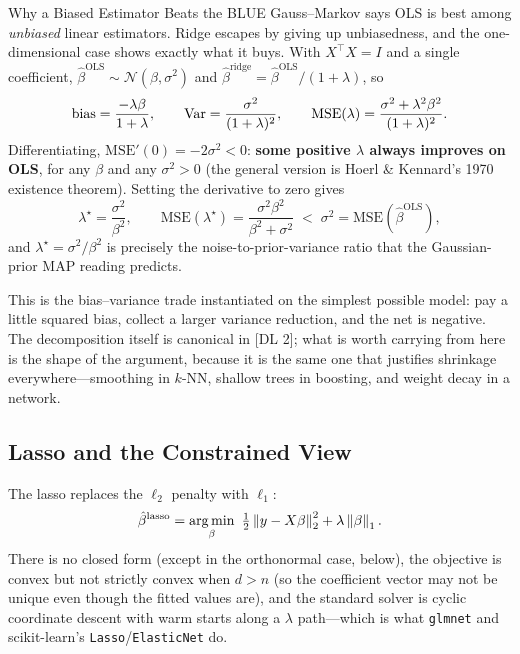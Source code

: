 \begin{mathresult}{Why a Biased Estimator Beats the BLUE}
Gauss--Markov says OLS is best among \emph{unbiased} linear estimators. Ridge escapes by giving up unbiasedness, and the one-dimensional case shows exactly what it buys. With $X^{\top}X = I$ and a single coefficient, $\hat\beta^{\text{OLS}} \sim \mathcal{N}(\beta, \sigma^2)$ and $\hat\beta^{\text{ridge}} = \hat\beta^{\text{OLS}}/(1+\lambda)$, so
\begin{equation}
\text{bias} = \frac{-\lambda\beta}{1+\lambda}, \qquad \operatorname{Var} = \frac{\sigma^2}{(1+\lambda)^2},
\qquad
\text{MSE}(\lambda) = \frac{\sigma^2 + \lambda^2\beta^2}{(1+\lambda)^2} .
\end{equation}
Differentiating, $\text{MSE}'(0) = -2\sigma^2 < 0$: \textbf{some positive $\lambda$ always improves on OLS}, for any $\beta$ and any $\sigma^2 > 0$ (the general version is Hoerl \& Kennard's 1970 existence theorem). Setting the derivative to zero gives
\begin{equation}
\lambda^\star = \frac{\sigma^2}{\beta^2},
\qquad
\text{MSE}(\lambda^\star) = \frac{\sigma^2\beta^2}{\beta^2 + \sigma^2} \;<\; \sigma^2 = \text{MSE}(\hat\beta^{\text{OLS}}),
\end{equation}
and $\lambda^\star = \sigma^2/\beta^2$ is precisely the noise-to-prior-variance ratio that the Gaussian-prior MAP reading predicts.
\end{mathresult}

This is the bias--variance trade instantiated on the simplest possible model: pay a little squared bias, collect a larger variance reduction, and the net is negative. The decomposition itself is canonical in [DL 2]; what is worth carrying from here is the shape of the argument, because it is the same one that justifies shrinkage everywhere---smoothing in $k$-NN, shallow trees in boosting, and weight decay in a network.

\subsection{Lasso and the Constrained View}

The lasso replaces the $\ell_2$ penalty with $\ell_1$:
\begin{equation}
\hat\beta^{\text{lasso}} = \argmin_\beta \ \tfrac{1}{2}\norm{y - X\beta}_2^2 + \lambda\norm{\beta}_1 .
\end{equation}
There is no closed form (except in the orthonormal case, below), the objective is convex but not strictly convex when $d>n$ (so the coefficient vector may not be unique even though the fitted values are), and the standard solver is cyclic coordinate descent with warm starts along a $\lambda$ path---which is what \texttt{glmnet} and scikit-learn's \texttt{Lasso}/\texttt{ElasticNet} do.

